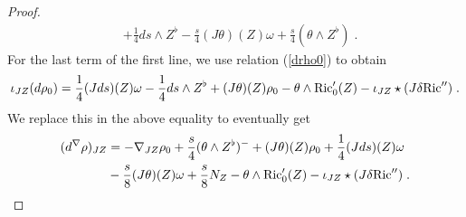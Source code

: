 \documentclass{amsart}
\newcommand{\na}{\nabla}
\begin{document}
\begin{proof}
\begin{equation}
\begin{split}
& + \frac{1}{4} ds \wedge Z^{\flat} - \frac{s}{4} (J\theta)(Z) \omega + \frac{s}{4} (\theta \wedge Z^{\flat}) \; .
\end{split} \end{equation}
For the last term of the first line, we use relation (\ref{drho0}) to obtain
$$\iota_{JZ} (d \rho_0) = \frac{1}{4} (Jds)(Z) \omega -  \frac{1}{4} ds \wedge Z^{\flat} + (J\theta)(Z) \rho_0 - \theta \wedge {\rm Ric}_0'(Z) - \iota_{JZ} \star(J \delta {\rm Ric}'') \; . $$
We replace this in the above equality to eventually get
\begin{equation} \label{dricinvterm1} \begin{split}
(d^{\na} \rho)_{JZ} &= - \nabla_{JZ} \rho_0 + \frac{s}{4} (\theta \wedge Z^{\flat})^{-} + (J\theta)(Z) \rho_0 +\frac{1}{4} (Jds)(Z) \omega \\
& - \frac{s}{8} (J\theta)(Z) \omega + \frac{s}{8} N_Z - \theta \wedge {\rm Ric}_0'(Z) - \iota_{JZ} \star (J\delta {\rm Ric}'')\; .
\end{split} \end{equation}


\end{proof}
\end{document}
